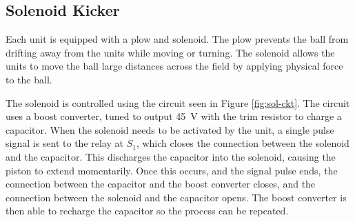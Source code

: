 \documentclass{article}
\begin{document}
          \subsection{Solenoid Kicker}
          Each unit is equipped with a plow and solenoid. The plow prevents the ball from drifting away from the units while moving or turning. The solenoid allows the units to move the ball large distances across the field by applying physical force to the ball.
          \par The solenoid is controlled using the circuit seen in Figure  \ref{fig:sol-ckt}. The circuit uses a boost converter, tuned to output \SI{45}{\volt} with the trim resistor to charge a capacitor. When the solenoid needs to be activated by the unit, a single pulse signal is sent to the relay at $S_1$, which closes the connection between the solenoid and the capacitor. This discharges the capacitor into the solenoid, causing the piston to extend momentarily. Once this occurs, and the signal pulse ends, the connection between the capacitor and the boost converter closes, and the connection between the solenoid and the capacitor opens. The boost converter is then able to recharge the capacitor so the process can be repeated.
\end{document}
